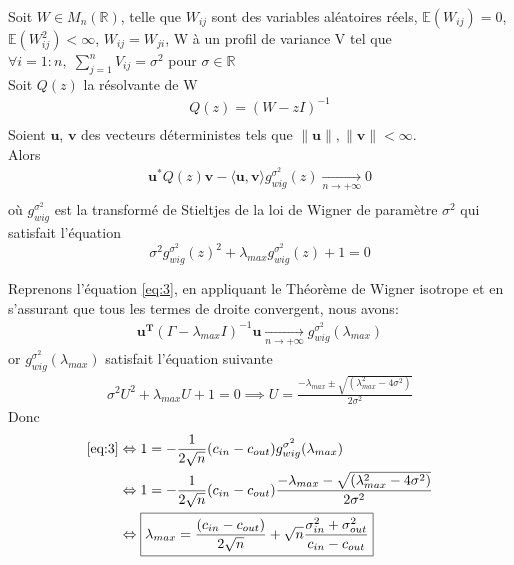 \begin{theorem}\label{th:2}

Soit $W \in M_{n}(\mathbb{R})$, telle que $W_{ij}$ sont des variables aléatoires réels, $\mathbb{E}(W_{ij}) = 0$, $\mathbb{E}(W_{ij}^2) < \infty$, $W_{ij} = W_{ji}$, W à un profil de variance V tel que $\forall i = 1:n , \; \sum_{j=1}^{n}V_{ij} = \sigma^2$ pour $\sigma \in \mathbb{R}$\\
Soit $Q(z)$ la résolvante de W
\begin{align*} 
Q(z) = (W - zI)^{-1}\\
\end{align*}
Soient $\mathbf{u}$, $\mathbf{v}$ des vecteurs déterministes tels que $\|\mathbf{u}\|, \|\mathbf{v}\| < \infty$.\\
Alors 
\begin{align*} 
\mathbf{u}^*Q(z)\mathbf{v} - \langle \mathbf{u}, \mathbf{v} \rangle g_{wig}^{\sigma^2}(z) \xrightarrow[n \to +\infty]{} 0\\
\end{align*}
où $g_{wig}^{\sigma^2}$ est la transformé de Stieltjes de la loi de Wigner de paramètre $\sigma^2$ qui satisfait l'équation
\begin{equation}
	\sigma^2g_{wig}^{\sigma^2}(z)^2+\lambda_{max}g_{wig}^{\sigma^2}(z)+1=0
\end{equation}
\end{theorem}
Reprenons l’équation \eqref{eq:3}, en appliquant le Théorème de Wigner isotrope et en s'assurant que tous les termes de droite convergent, nous avons:
\begin{align*}
\mathbf{u^T}(\Gamma - \lambda_{max}I)^{-1}\mathbf{u} \xrightarrow[n \to +\infty]{} g_{wig}^{\sigma^2}(\lambda_{max})
\end{align*}
or $g_{wig}^{\sigma^2}(\lambda_{max})$ satisfait l'équation suivante 
\begin{align}
	\sigma^2U^2+\lambda_{max}U+1=0 \implies U = \frac{- \lambda_{max} \pm \sqrt{(\lambda_{max}^2 - 4\sigma^2)}}{2\sigma^2}
\end{align}
Donc
\begin{align}
	\eqref{eq:3} &\Leftrightarrow1 = -\frac{1}{2\sqrt{n}}(c_{in} - c_{out}) g_{wig}^{\sigma^2}(\lambda_{max}) \nonumber\\
	&\Leftrightarrow 1 = -\frac{1}{2\sqrt{n}}(c_{in} - c_{out}) \frac{- \lambda_{max} - \sqrt{(\lambda_{max}^2 - 4\sigma^2)}}{2\sigma^2} \nonumber\\
	&\Leftrightarrow \boxed{\lambda_{max}=\frac{(c_{in} - c_{out})}{2\sqrt{n}} + \sqrt{n}\frac{\sigma_{in}^2 + \sigma_{out}^2}{c_{in} - c_{out}}} \label{z_1}
\end{align}

